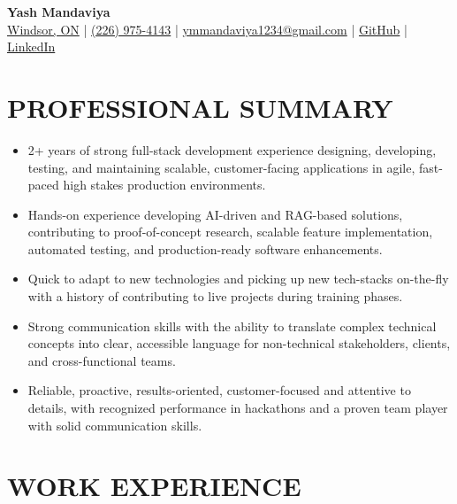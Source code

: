 \documentclass[10pt, letterpaper]{article}
\begin{document}
\begin{center}
    \textbf{\Huge Yash Mandaviya} \\
    \vspace{0.1cm}
    \href{https://www.google.com/maps/place/Windsor,+ON} {Windsor, ON} |
    \href{tel:+12269754143}{(226) 975-4143} | 
    \href{mailto:ymmandaviya1234@gmail.com}{ymmandaviya1234@gmail.com} | \href{https://github.com/yash-mandaviya}{GitHub} | \href{https://linkedin.com/in/yash-mandaviya}{LinkedIn}
\end{center}

\section{PROFESSIONAL SUMMARY}
\vspace{0.1cm}
\begin{itemize}
    \item 2+ years of strong full-stack development experience designing, developing, testing, and maintaining scalable, customer-facing applications in agile, fast-paced high stakes production environments.
    \item Hands-on experience developing AI-driven and RAG-based solutions, contributing to proof-of-concept research, scalable feature implementation, automated testing, and production-ready software enhancements.
    \item Quick to adapt to new technologies and picking up new tech-stacks on-the-fly with a history of contributing to live projects during training phases.
    \item Strong communication skills with the ability to translate complex technical concepts into clear, accessible language for non-technical stakeholders, clients, and cross-functional teams.
    \item Reliable, proactive, results-oriented, customer-focused and attentive to details, with recognized performance in hackathons and a proven team player with solid communication skills. 

\end{itemize}
\vspace{0.1cm}
\vspace{0.1cm}

\section{WORK EXPERIENCE}
\vspace{0.1cm}
\end{document}
